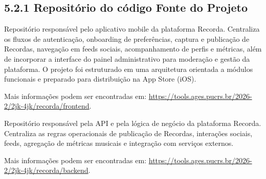 \hypertarget{__RefHeading___Toc4833_3118176633}{}
\subsection*{5.2.1 Repositório do código Fonte do Projeto}
\label{ages-iv:text-h-0108}

Repositório responsável pelo aplicativo mobile da plataforma Recorda. Centraliza os fluxos de autenticação, onboarding de preferências, captura e publicação de Recordas, navegação em feeds sociais, acompanhamento de perfis e métricas, além de incorporar a interface do painel administrativo para moderação e gestão da plataforma. O projeto foi estruturado em uma arquitetura orientada a módulos funcionais e preparado para distribuição na App Store\space\cite{ages-iv-app-store} (iOS).\par

Mais informações podem ser encontradas em: \url{https://tools.ages.pucrs.br/2026-2/2jk-4jk/recorda/frontend}.\par

Repositório responsável pela API e pela lógica de negócio da plataforma Recorda. Centraliza as regras operacionais de publicação de Recordas, interações sociais, feeds, agregação de métricas musicais e integração com serviços externos.\par

Mais informações podem ser encontradas em: \url{https://tools.ages.pucrs.br/2026-2/2jk-4jk/recorda/backend}.\par
